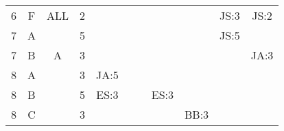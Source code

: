 \documentclass[12pt]{article}
\begin{document}
\begin{table}[H]
\begin{tabular}{@{}c|c|c|c|ccccccc@{}}
6     & F    & ALL        & 2                                                      &                                                 &                                                &                                                   &                                                  &                                                  &  JS:3                                                &  JS:2                                                \\
7     & A    &            & 5                                                      &                                                 &                                             &                                                  &                                                  &                                                  &  JS:5                                                &                                                  \\
7     & B    & A          & 3                                                      &                                                 &                                                 &                                                 &                                                  &                                                  &                                                  & JA:3                                                 \\
8     & A    &            & 3                                                      & JA:5                                            &                                                 &                                                  &                                                  &                                                  &                                                  &                                                  \\
8     & B    &            & 5                                                      & ES:3                                            &                                                 &                                                 &   ES:3                                                &                                                  &                                                  &                                                  \\ 
8     & C    &            & 3                                                      &                                                 &                                                 &                                                  &                                              &         BB:3                                         &                                                  &                                                  \\ 

\end{tabular}
\end{table}
\end{document}
